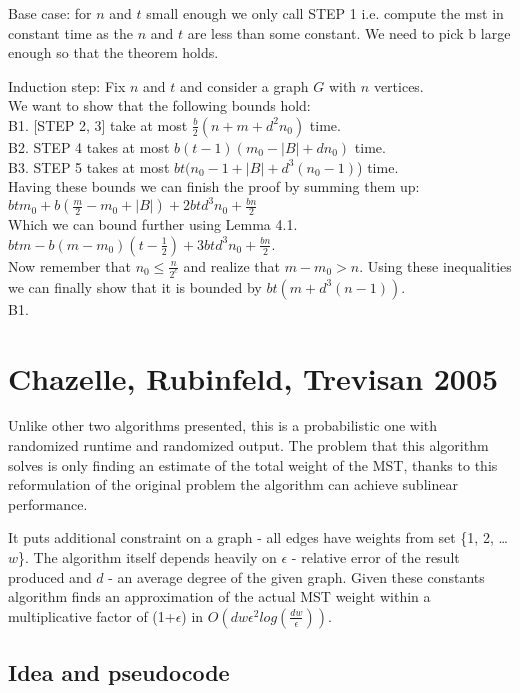 \documentclass{article}
\begin{document}
Base case:
for $n$ and $t$ small enough we only call STEP 1 i.e. compute the mst in constant time as the $n$ and $t$ are less than some constant. We need to pick b large enough so that the theorem holds.

Induction step:
Fix $n$ and $t$ and consider a graph $G$ with $n$ vertices. \\ We want to show that the following bounds hold: \\
B1. [STEP 2, 3] take at most $\frac{b}2(n+m+d^2n_0)$ time. \\
B2. STEP 4 takes at most $b(t-1)(m_0 - |B| + dn_0)$ time. \\
B3. STEP 5 takes at most $bt(n_0 - 1 + |B| + d^3(n_0 - 1)$) time. \\

Having these bounds we can finish the proof by summing them up: \\
$btm_0 + b(\frac{m}2 - m_0 + |B|) + 2btd^3n_0 + \frac{bn}2$ \\

Which we can bound further using Lemma 4.1.\\
$btm - b(m - m_0)(t - \frac12) + 3btd^3n_0 + \frac{bn}{2}$.\\

Now remember that $n_0 \leq \frac{n}{2^c}$ and realize that  $m - m_0 > n$. Using these inequalities we can finally show that it is bounded by $bt(m+ d^3(n-1))$. \\

B1.

\section{Chazelle, Rubinfeld, Trevisan 2005}
Unlike other two algorithms presented, this is a probabilistic one with randomized runtime and randomized output. The problem that this algorithm solves is only finding an estimate of the total weight of the MST, thanks to this reformulation of the original problem the algorithm can achieve sublinear performance. 

It puts additional constraint on a graph - all edges have weights from set \{1, 2, \dots $w$\}. The algorithm itself depends heavily on $\epsilon$ - relative error of the result produced and $d$ - an average degree of the given graph. Given these constants algorithm finds an approximation of the actual MST weight within a multiplicative factor of (1+$\epsilon$) in $O(dw\epsilon^2log(\frac{dw}{\epsilon}))$. 

\subsection{Idea and pseudocode}
\end{document}
